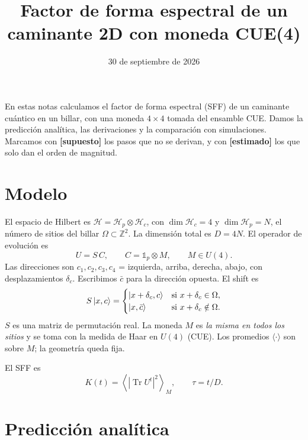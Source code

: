 \documentclass[aps, pra, onecolumn, longbibliography]{revtex4-2}
\newcommand{\Tr}{\operatorname{Tr}}
\begin{document}
\title{Factor de forma espectral de un caminante 2D con moneda CUE(4)}
\date{30 de septiembre de 2026}
\maketitle

En estas notas calculamos el factor de forma espectral (SFF) de un caminante
cuántico en un billar, con una moneda $4\times4$ tomada del ensamble CUE. Damos
la predicción analítica, las derivaciones y la comparación con simulaciones.
Marcamos con \textbf{[supuesto]} los pasos que no se derivan, y con
\textbf{[estimado]} los que solo dan el orden de magnitud.

\section{Modelo}

El espacio de Hilbert es $\mathcal H=\mathcal H_p\otimes\mathcal H_c$, con
$\dim\mathcal H_c=4$ y $\dim\mathcal H_p=N$, el número de sitios del billar
$\Omega\subset\mathbb Z^2$. La dimensión total es $D=4N$. El operador de
evolución es
\begin{equation}
    U=S\,C,\qquad C=\mathbb 1_p\otimes M,\qquad M\in U(4).
\end{equation}
Las direcciones son $c_1,c_2,c_3,c_4$ = izquierda, arriba, derecha, abajo, con
desplazamientos $\delta_c$. Escribimos $\bar c$ para la dirección opuesta. El
shift es
\begin{equation}
    S\ket{x,c}=
    \begin{cases}
        \ket{x+\delta_c,c} & \text{si } x+\delta_c\in\Omega,\\
        \ket{x,\bar c} & \text{si } x+\delta_c\notin\Omega.
    \end{cases}
    \label{eq:S}
\end{equation}
$S$ es una matriz de permutación real. La moneda $M$ es \emph{la misma en todos
los sitios} y se toma con la medida de Haar en $U(4)$ (CUE). Los promedios
$\langle\cdot\rangle$ son sobre $M$; la geometría queda fija.

El SFF es
\begin{equation}
    K(t)=\left\langle\left|\Tr U^t\right|^2\right\rangle_M ,
    \qquad \tau=t/D .
\end{equation}

\section{Predicción analítica}
\end{document}
